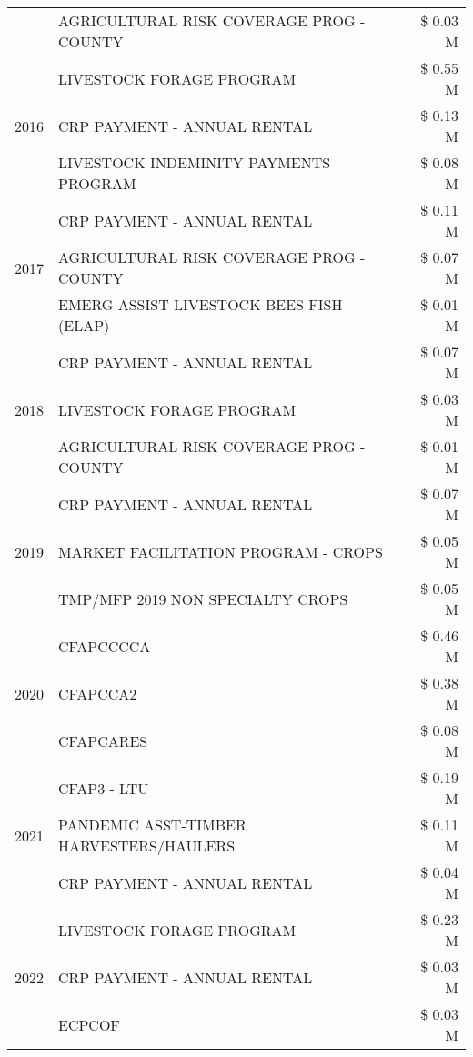 \begin{tabular}{llr}
 & AGRICULTURAL RISK COVERAGE PROG - COUNTY & \$ 0.03 M \\
\cline{1-3}
\multirow[t]{3}{*}{2016} & LIVESTOCK FORAGE PROGRAM & \$ 0.55 M \\
 & CRP PAYMENT - ANNUAL RENTAL & \$ 0.13 M \\
 & LIVESTOCK INDEMINITY PAYMENTS PROGRAM & \$ 0.08 M \\
\cline{1-3}
\multirow[t]{3}{*}{2017} & CRP PAYMENT - ANNUAL RENTAL & \$ 0.11 M \\
 & AGRICULTURAL RISK COVERAGE PROG - COUNTY & \$ 0.07 M \\
 & EMERG ASSIST LIVESTOCK BEES FISH (ELAP) & \$ 0.01 M \\
\cline{1-3}
\multirow[t]{3}{*}{2018} & CRP PAYMENT - ANNUAL RENTAL & \$ 0.07 M \\
 & LIVESTOCK FORAGE PROGRAM & \$ 0.03 M \\
 & AGRICULTURAL RISK COVERAGE PROG - COUNTY & \$ 0.01 M \\
\cline{1-3}
\multirow[t]{3}{*}{2019} & CRP PAYMENT - ANNUAL RENTAL & \$ 0.07 M \\
 & MARKET FACILITATION PROGRAM - CROPS & \$ 0.05 M \\
 & TMP/MFP 2019 NON SPECIALTY CROPS & \$ 0.05 M \\
\cline{1-3}
\multirow[t]{3}{*}{2020} & CFAPCCCCA & \$ 0.46 M \\
 & CFAPCCA2 & \$ 0.38 M \\
 & CFAPCARES & \$ 0.08 M \\
\cline{1-3}
\multirow[t]{3}{*}{2021} & CFAP3 - LTU & \$ 0.19 M \\
 & PANDEMIC ASST-TIMBER HARVESTERS/HAULERS & \$ 0.11 M \\
 & CRP PAYMENT - ANNUAL RENTAL & \$ 0.04 M \\
\cline{1-3}
\multirow[t]{3}{*}{2022} & LIVESTOCK FORAGE PROGRAM & \$ 0.23 M \\
 & CRP PAYMENT - ANNUAL RENTAL & \$ 0.03 M \\
 & ECPCOF & \$ 0.03 M \\
\cline{1-3}
\bottomrule
\end{tabular}
